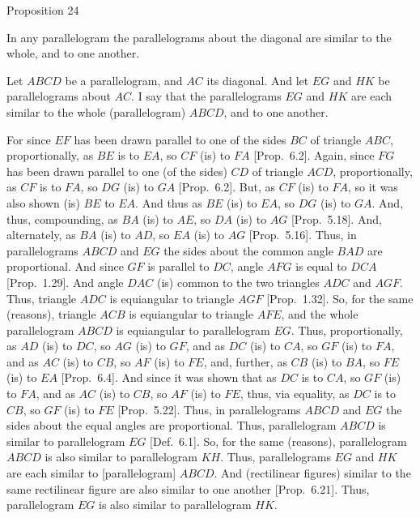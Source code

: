 
\begin{center}
{\large Proposition 24}
\end{center}

In any parallelogram the parallelograms
about the diagonal are similar to the whole, and to one another.

Let $ABCD$ be a parallelogram, and $AC$ its diagonal. And let
$EG$ and $HK$ be parallelograms about $AC$. I say that the
parallelograms $EG$ and $HK$ are each similar to the whole (parallelogram) $ABCD$, and
to one another.

For since $EF$ has been drawn parallel to one of the sides $BC$ of triangle
$ABC$, proportionally, as $BE$ is to $EA$, so $CF$ (is) to $FA$ [Prop.~6.2]. Again, since $FG$ has been drawn
parallel to one (of the sides) $CD$ of triangle $ACD$, proportionally, 
as $CF$ is to $FA$, so $DG$ (is) to $GA$ [Prop.~6.2].
But, as $CF$ (is) to $FA$, so it was also shown (is) $BE$ to $EA$. And thus as
$BE$ (is) to $EA$, so $DG$ (is) to $GA$. And, thus, compounding, as $BA$ (is) to
$AE$, so $DA$ (is) to $AG$ [Prop.~5.18].
And, alternately, as $BA$ (is) to $AD$, so $EA$ (is) to $AG$ [Prop.~5.16]. Thus, in parallelograms
$ABCD$ and $EG$ the sides about the common angle $BAD$ are proportional.
And since $GF$ is parallel to $DC$, angle $AFG$ is equal to $DCA$  [Prop.~1.29]. And angle $DAC$ (is) common to the two triangles $ADC$ and
$AGF$. Thus, triangle $ADC$ is equiangular to triangle $AGF$  [Prop.~1.32]. So, for the same (reasons), triangle $ACB$ is equiangular to triangle $AFE$,
and the whole parallelogram $ABCD$ is equiangular to parallelogram $EG$. Thus,
proportionally, as $AD$ (is) to $DC$, so $AG$ (is) to $GF$, and as $DC$ (is) to 
$CA$, so $GF$ (is) to $FA$, and as $AC$ (is) to $CB$, so $AF$ (is) to $FE$, and, further, 
as $CB$ (is) to $BA$, so $FE$ (is) to $EA$ [Prop.~6.4].
And since it was shown that as $DC$  is to $CA$, so $GF$ (is) to $FA$, and
as $AC$ (is) to $CB$, so $AF$ (is) to $FE$, thus, via equality, as $DC$ is to $CB$,
so $GF$ (is) to $FE$ [Prop.~5.22]. 
Thus, in parallelograms $ABCD$ and $EG$ the sides about the equal angles are
proportional. Thus, parallelogram $ABCD$ is similar to parallelogram $EG$ [Def.~6.1]. So, for the same (reasons), 
parallelogram $ABCD$ is also similar to parallelogram $KH$. Thus, parallelograms $EG$ and $HK$ are each similar to [parallelogram] $ABCD$.
And (rectilinear figures) similar to the same rectilinear figure are also
similar to one another [Prop.~6.21].
Thus, parallelogram $EG$ is also similar to parallelogram $HK$.\\

